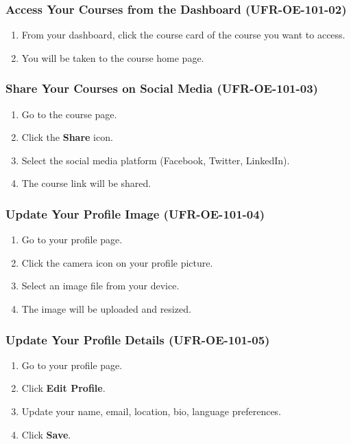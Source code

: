 \subsubsection{Access Your Courses from the Dashboard (UFR-OE-101-02)}
\begin{enumerate}
    \item From your dashboard, click the course card of the course you want to access.
    \item You will be taken to the course home page.
\end{enumerate}

\subsubsection{Share Your Courses on Social Media (UFR-OE-101-03)}
\begin{enumerate}
    \item Go to the course page.
    \item Click the \textbf{Share} icon.
    \item Select the social media platform (Facebook, Twitter, LinkedIn).
    \item The course link will be shared.
\end{enumerate}

\subsubsection{Update Your Profile Image (UFR-OE-101-04)}
\begin{enumerate}
    \item Go to your profile page.
    \item Click the camera icon on your profile picture.
    \item Select an image file from your device.
    \item The image will be uploaded and resized.
\end{enumerate}

\subsubsection{Update Your Profile Details (UFR-OE-101-05)}
\begin{enumerate}
    \item Go to your profile page.
    \item Click \textbf{Edit Profile}.
    \item Update your name, email, location, bio, language preferences.
    \item Click \textbf{Save}.
\end{enumerate}

